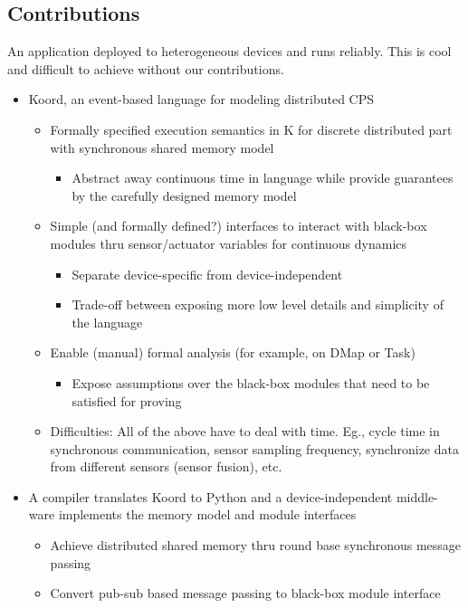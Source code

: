 \subsection{Contributions~}
An application deployed to heterogeneous devices and runs reliably.
This is cool and difficult to achieve without our contributions.
\begin{itemize}
\item Koord, an event-based language for modeling distributed CPS
\begin{itemize}
\item Formally specified execution semantics in K for discrete distributed part with synchronous shared memory model
\begin{itemize}
    \item Abstract away continuous time in language while provide guarantees by the carefully designed memory model
\end{itemize}
\item Simple (and formally defined?) interfaces to interact with black-box modules thru sensor/actuator variables for continuous dynamics
\begin{itemize}
\item Separate device-specific from device-independent
\item Trade-off between exposing more low level details and simplicity of the language
\end{itemize}
\item Enable (manual) formal analysis (for example, on DMap or Task)
\begin{itemize}
\item Expose assumptions over the black-box modules that need to be satisfied for proving
\end{itemize}
\item Difficulties: All of the above have to deal with time. Eg., cycle time in synchronous communication, sensor sampling frequency, synchronize data from different sensors (sensor fusion), etc.
\end{itemize}
\item  A compiler translates Koord to Python and a device-independent middle-ware implements the memory model and module interfaces
\begin{itemize}
\item Achieve distributed shared memory thru round base synchronous message passing
\item Convert pub-sub based message passing to black-box module interface
\begin{itemize}

\end{itemize}
\end{itemize}
\end{itemize}
